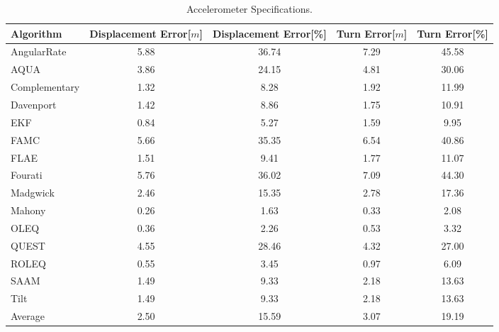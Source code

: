 \begin{table}[H]
    \begin{center}
        \begin{tabular}[t]{lcccc}
            \hline
            Algorithm                   & Displacement Error[$m$] & Displacement Error[\%]      & Turn Error[$m$]  & Turn Error[\%]             \\
            \hline 
            AngularRate            & 5.88  & 36.74 & 7.29 & 45.58              \\            AQUA            & 3.86  & 24.15 & 4.81 & 30.06              \\            Complementary            & 1.32  & 8.28 & 1.92 & 11.99              \\            Davenport            & 1.42  & 8.86 & 1.75 & 10.91              \\            EKF            & 0.84  & 5.27 & 1.59 & 9.95              \\            FAMC            & 5.66  & 35.35 & 6.54 & 40.86              \\            FLAE            & 1.51  & 9.41 & 1.77 & 11.07              \\            Fourati            & 5.76  & 36.02 & 7.09 & 44.30              \\            Madgwick            & 2.46  & 15.35 & 2.78 & 17.36              \\            Mahony            & 0.26  & 1.63 & 0.33 & 2.08              \\            OLEQ            & 0.36  & 2.26 & 0.53 & 3.32              \\            QUEST            & 4.55  & 28.46 & 4.32 & 27.00              \\            ROLEQ            & 0.55  & 3.45 & 0.97 & 6.09              \\            SAAM            & 1.49  & 9.33 & 2.18 & 13.63              \\            Tilt            & 1.49  & 9.33 & 2.18 & 13.63              \\
            \hline
            Average & 2.50 & 15.59 & 3.07 & 19.19
        \end{tabular}
        \caption{Accelerometer Specifications. }
        \label{tab:accelerometer_specification}
    \end{center}
\end{table}